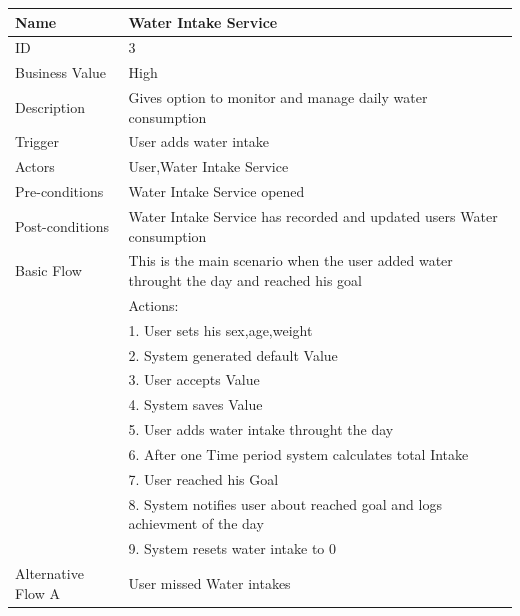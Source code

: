 \documentclass{article}
\begin{document}
\begin{table}[h!]
    \begin{tabularx}{\textwidth}{|>{\raggedright\arraybackslash}p{}|X|}
        \hline
        Name             & Water Intake Service                                \\ \hline
        ID               & 3                                                                                     \\ \hline
        Business Value   & High                                                                                    \\ \hline
        Description      & Gives option to monitor and manage daily water consumption \\ \hline
        Trigger          & User adds water intake  \\ \hline
        Actors           & User,Water Intake Service                                \\ \hline
        Pre-conditions   & Water Intake Service opened                                 \\ \hline
        Post-conditions  & Water Intake Service has recorded and updated users Water consumption                                                     \\ \hline
        Basic Flow       & This is the main scenario when the user added water throught the day and reached his goal \\ \hline
                         & Actions: \\
                         & 1. User sets his sex,age,weight\\
                         & 2. System generated default Value \\
                         & 3. User accepts Value \\
                         & 4. System saves Value \\
                         & 5. User adds water intake throught the day\\
                         & 6. After one Time period system calculates total Intake \\
                         & 7. User reached his Goal \\
                         & 8. System notifies user about reached goal and logs achievment of the day\\ 
                         & 9. System resets water intake to 0\\ \hline
        Alternative Flow A & User missed Water intakes  \\

\end{tabularx}
\end{table}
\end{document}
